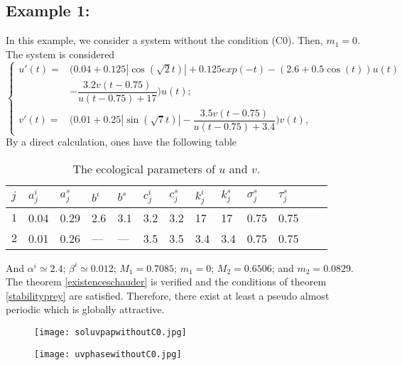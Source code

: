 \documentclass[[a4paper,10pt]{article}
\begin{document}
\subsection{Example 1:} \hspace{1cm}In this example, we consider a system without the condition (C0). Then, $m_1=0$. The system is considered
\begin{equation}
\left \{
\begin{aligned}
u'(t)=&\bigg(0.04+0.125|\cos(\sqrt{2}t)|+0.125exp(-t)-(2.6+0.5\cos(t))u(t)\\&-\dfrac{3.2 v(t-0.75)}{u(t-0.75)+17 }\bigg)u(t);\\
v'(t)=&\bigg(0.01+0.25|\sin(\sqrt{7}t)|-\dfrac{3.5v(t-0.75)}{u(t-0.75)+3.4}\bigg)v(t), 
\end{aligned}\right.
\end{equation}
By a direct calculation, ones have the following table
\begin{center}
\begin{table}[hbtp]
\caption{The ecological parameters of $u$ and $v$.}
\begin{center}
\begin{tabular}{|p{0.5cm}|p{1cm}|p{1cm}| p{1cm}|p{1cm}|p{1cm}|p{1cm}|p{1cm}|p{1cm} |p{1cm} |p{1cm} |p{1cm}|l}
\hline
 $j$ & $a_j^i$& $a_j^s$& $b^i$& $b^s$&$c_j^i$& $c_j^s$&$k_j^i$& $k_j^s$ & $\sigma_j^s$& $\tau_j^s$\\
  \hline\hline
$1$& 0.04 & 0.29& 2.6 & 3.1 &3.2 &3.2 &17 &17 & 0.75& 0.75\\
\hline
$2$& 0.01 & 0.26 &---&---&3.5 &3.5 & 3.4& 3.4& 0.75&0.75 \\
\hline
\end{tabular}
\end{center}
\end{table}
\end{center}
And $\alpha^i\simeq 2.4$; $\beta^i\simeq 0.012$; $M_1=0.7085$; $m_1=0$; $M_2=0.6506$; and $m_2=0.0829$.
The theorem \eqref{existenceschauder} is verified and the conditions of  theorem \eqref{stabilityprey} are satisfied. Therefore, there exist  at least a pseudo almost periodic which is globally attractive.
\begin{figure}[ht]
\begin{center}
\texttt{[image: soluvpapwithoutC0.jpg]}
\end{center}
\end{figure}
\begin{figure}[ht]
\begin{center}
\texttt{[image: uvphasewithoutC0.jpg]}
\end{center}
\end{figure}
\end{document}

